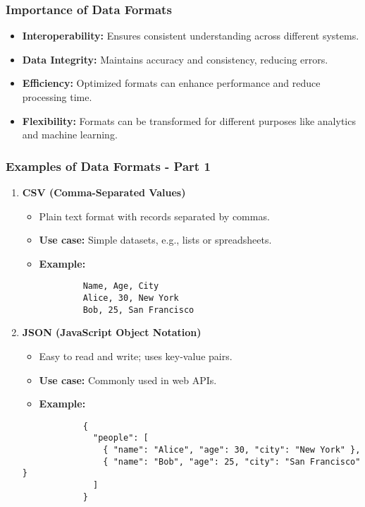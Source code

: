 \documentclass[aspectratio=169]{beamer}
\begin{document}
\begin{frame}[fragile]
    \frametitle{Importance of Data Formats}
    \begin{itemize}
        \item \textbf{Interoperability:} Ensures consistent understanding across different systems.
        \item \textbf{Data Integrity:} Maintains accuracy and consistency, reducing errors.
        \item \textbf{Efficiency:} Optimized formats can enhance performance and reduce processing time.
        \item \textbf{Flexibility:} Formats can be transformed for different purposes like analytics and machine learning.
    \end{itemize}
\end{frame}

\begin{frame}[fragile]
    \frametitle{Examples of Data Formats - Part 1}
    \begin{enumerate}
        \item \textbf{CSV (Comma-Separated Values)}
            \begin{itemize}
                \item Plain text format with records separated by commas.
                \item \textbf{Use case:} Simple datasets, e.g., lists or spreadsheets.
                \item \textbf{Example:}
            \end{itemize}
            \begin{lstlisting}
            Name, Age, City
            Alice, 30, New York
            Bob, 25, San Francisco
            \end{lstlisting}
            
        \item \textbf{JSON (JavaScript Object Notation)}
            \begin{itemize}
                \item Easy to read and write; uses key-value pairs.
                \item \textbf{Use case:} Commonly used in web APIs.
                \item \textbf{Example:}
            \end{itemize}
            \begin{lstlisting}
            {
              "people": [
                { "name": "Alice", "age": 30, "city": "New York" },
                { "name": "Bob", "age": 25, "city": "San Francisco" }
              ]
            }
            \end{lstlisting}
    \end{enumerate}
\end{frame}
\end{document}
